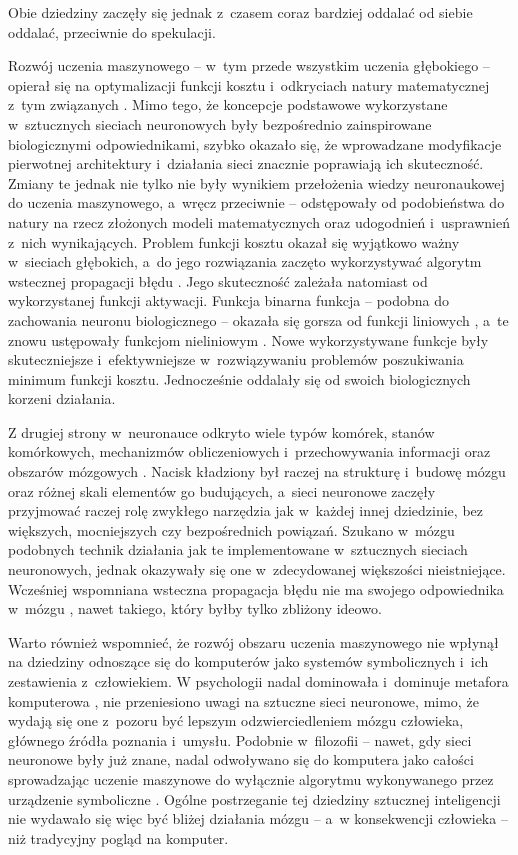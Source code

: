 Obie dziedziny zaczęły się jednak z~czasem coraz bardziej oddalać od siebie oddalać, przeciwnie do spekulacji.

Rozwój uczenia maszynowego -- w~tym przede wszystkim uczenia głębokiego -- opierał się na optymalizacji funkcji kosztu i~odkryciach natury matematycznej z~tym związanych \cite{sutskever2013importance}.
Mimo tego, że koncepcje podstawowe wykorzystane w~sztucznych sieciach neuronowych były bezpośrednio zainspirowane biologicznymi odpowiednikami, szybko okazało się, że wprowadzane modyfikacje pierwotnej architektury i~działania sieci znacznie poprawiają ich skuteczność.
Zmiany te jednak nie tylko nie były wynikiem przełożenia wiedzy neuronaukowej do uczenia maszynowego, a~wręcz przeciwnie -- odstępowały od podobieństwa do natury na rzecz złożonych modeli matematycznych oraz udogodnień i~usprawnień z~nich wynikających.
Problem funkcji kosztu okazał się wyjątkowo ważny w~sieciach głębokich, a~do jego rozwiązania zaczęto wykorzystywać algorytm wstecznej propagacji błędu \cite{rumelhart1985learning}.
Jego skuteczność zależała natomiast od wykorzystanej funkcji aktywacji.
Funkcja binarna funkcja -- podobna do zachowania neuronu biologicznego -- okazała się gorsza od funkcji liniowych \cite{minsky2017perceptrons}, a~te znowu ustępowały funkcjom nieliniowym \cite{haykin1994neural}.
Nowe wykorzystywane funkcje były skuteczniejsze i~efektywniejsze \cite{sharma2017activation} w~rozwiązywaniu problemów poszukiwania minimum funkcji kosztu.
Jednocześnie oddalały się od swoich biologicznych korzeni działania.

Z drugiej strony w~neuronauce odkryto wiele typów komórek, stanów komórkowych, mechanizmów obliczeniowych i~przechowywania informacji oraz obszarów mózgowych \cite{solari2011cognitive}.
Nacisk kładziony był raczej na strukturę i~budowę mózgu oraz różnej skali elementów go budujących, a~sieci neuronowe zaczęły przyjmować raczej rolę zwykłego narzędzia jak w~każdej innej dziedzinie, bez większych, mocniejszych czy bezpośrednich powiązań.
Szukano w~mózgu podobnych technik działania jak te implementowane w~sztucznych sieciach neuronowych, jednak okazywały się one w~zdecydowanej większości nieistniejące.
Wcześniej wspomniana wsteczna propagacja błędu nie ma swojego odpowiednika w~mózgu \cite{hassabis2017neuroscience}, nawet takiego, który byłby tylko zbliżony ideowo.

Warto również wspomnieć, że rozwój obszaru uczenia maszynowego nie wpłynął na dziedziny odnoszące się do komputerów jako systemów symbolicznych i~ich zestawienia z~człowiekiem.
W psychologii nadal dominowała i~dominuje metafora komputerowa \cite{casey1989computational}, nie przeniesiono uwagi na sztuczne sieci neuronowe, mimo, że wydają się one z~pozoru być lepszym odzwierciedleniem mózgu człowieka, głównego źródła poznania i~umysłu.
Podobnie w~filozofii -- nawet, gdy sieci neuronowe były już znane, nadal odwoływano się do komputera jako całości sprowadzając uczenie maszynowe do wyłącznie algorytmu wykonywanego przez urządzenie symboliczne \cite{searle1980minds}.
Ogólne postrzeganie tej dziedziny sztucznej inteligencji nie wydawało się więc być bliżej działania mózgu -- a~w konsekwencji człowieka -- niż tradycyjny pogląd na komputer.


